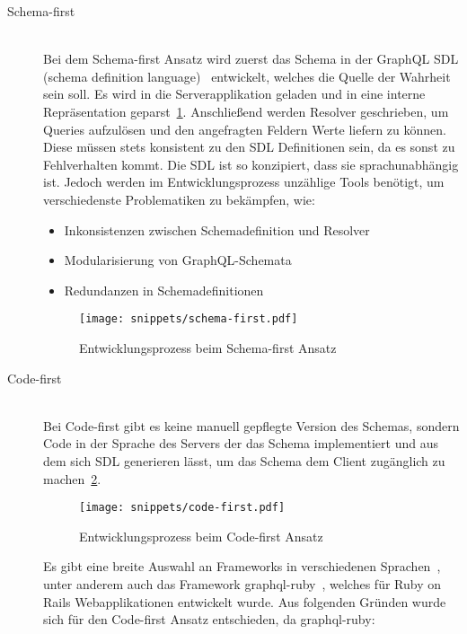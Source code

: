 \begin{description}
	\item[Schema-first\label{graphql:schema-first}] \ \\
	Bei dem Schema-first Ansatz wird zuerst das Schema in der GraphQL SDL (schema definition language)~\cite{graphql-sdl} entwickelt, welches die Quelle der Wahrheit sein soll. Es wird in die Serverapplikation geladen und in eine interne Repräsentation geparst~\ref{fig:schema-first}. Anschließend werden Resolver geschrieben, um Queries aufzulösen und den angefragten Feldern Werte liefern zu können. Diese müssen stets konsistent zu den SDL Definitionen sein, da es sonst zu Fehlverhalten kommt. 
	Die SDL ist so konzipiert, dass sie sprachunabhängig ist. Jedoch werden im Entwicklungsprozess unzählige Tools benötigt, um verschiedenste Problematiken zu bekämpfen, wie:
	
	\begin{itemize}
		\setlength\itemsep{-1em}
		\item Inkonsistenzen zwischen Schemadefinition und Resolver
		\item Modularisierung von GraphQL-Schemata
		\item Redundanzen in Schemadefinitionen
	\end{itemize}
	
	\begin{figure}[h!]
		\centering
		\texttt{[image: snippets/schema-first.pdf]}
		\caption{Entwicklungsprozess beim Schema-first Ansatz}
		\label{fig:schema-first}
	\end{figure}

	\item[Code-first\label{graphql:code-first}] \ \\
	Bei Code-first gibt es keine manuell gepflegte Version des Schemas, sondern Code in der Sprache des Servers der das Schema implementiert und aus dem sich SDL generieren lässt, um das Schema dem Client zugänglich zu machen~\ref{fig:code-first}. 
	
	\begin{figure}[h!]
		\centering
		\texttt{[image: snippets/code-first.pdf]}
		\caption{Entwicklungsprozess beim Code-first Ansatz}
		\label{fig:code-first}
	\end{figure}
	
	
	Es gibt eine breite Auswahl an Frameworks in verschiedenen Sprachen~\cite{code-first-frameworks}, unter anderem auch das Framework graphql-ruby~\cite{graphql-ruby}, welches für Ruby on Rails Webapplikationen entwickelt wurde. 
	Aus folgenden Gründen wurde sich für den Code-first Ansatz entschieden, da graphql-ruby:


\end{description}
